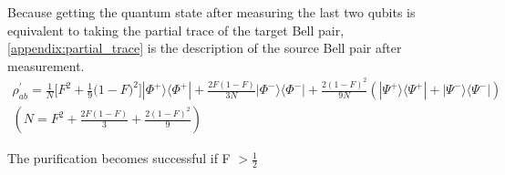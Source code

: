 Because getting the quantum state after measuring the last two qubits is equivalent to taking the partial trace of the target Bell pair, \ref{appendix:partial_trace} is the description of the source Bell pair after measurement.
\begin{multline*}
  \rho^{'}_{ab} = \frac{1}{N} \big[ F^2 + \frac{1}{9}\big(1-F \big)^2\big]|\Phi^+\rangle\langle\Phi^+| + \frac{2F(1-F)}{3N}|\Phi^-\rangle\langle\Phi^-| + \frac{2(1-F)^2}{9N}(|\Psi^+\rangle\langle\Psi^+| + |\Psi^-\rangle\langle\Psi^-|) \\
  (N = F^2 + \frac{2F(1-F)}{3} + \frac{2(1-F)^2}{9})
  \label{appendix:partial_trace}
\end{multline*}

The purification becomes successful if F  $> \frac{1}{2}$


